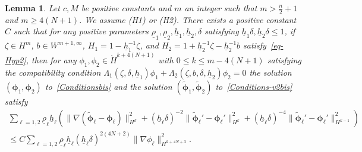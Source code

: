 \documentclass[11pt,leqno]{article}
\newtheorem{lemma}[theorem]{\bf Lemma}
\numberwithin{equation}{section}
\numberwithin{figure}{section}
\begin{document}
\begin{lemma}\label{L.estimate-phi-phi}
Let $c, M$ be positive constants and $m$ an integer such that $m>\frac{n}{2}+1$ and ${m\geq4(N+1)}$. 
We assume {\rm (H1)} or {\rm (H2)}. 
There exists a positive constant $C$ such that for any positive parameters 
$\underline{\rho}_1, \underline{\rho}_2, \underline{h}_1, \underline{h}_2, \delta$ 
satisfying $\underline{h}_1\delta, \underline{h}_2\delta \leq 1$, 
if $\zeta\in H^m$, $b\in W^{m+1,\infty}$, $H_1 = 1 - \underline{h}_1^{-1}\zeta$, 
and $H_2 = 1 + \underline{h}_2^{-1}\zeta - \underline{h}_2^{-1}b$ satisfy~\eqref{eq-Hyp2}, 
then for any $\phi_1,\phi_2 \in \mathring{H}^{k+4(N+1)}$ with $0\leq k\leq m-4(N+1)$ satisfying the compatibility condition 
$\Lambda_1(\zeta,\delta,\underline{h}_1)\phi_1+\Lambda_2(\zeta,b,\delta,\underline{h}_2)\phi_2=0$ 
the solution $(\bm{\phi}_1,\bm{\phi}_2)$ to~\eqref{Conditionsbis} and the solution 
$(\tilde{\bm{\phi}}_1,\tilde{\bm{\phi}}_2)$ to~\eqref{Conditions-v2bis} satisfy 
%
\begin{align*}
\sum_{\ell=1,2}\underline{\rho}_\ell \underline{h}_\ell(
 \|\nabla(\tilde{\bm{\phi}}_\ell-\bm{\phi}_\ell)\|_{H^k}^2
 + (\underline{h}_\ell\delta)^{-2}\|\tilde{\bm{\phi}}_\ell'-\bm{\phi}_\ell'\|_{H^k}^2
 + (\underline{h}_\ell\delta)^{-4}\|\tilde{\bm{\phi}}_\ell'-\bm{\phi}_\ell'\|_{H^{k-1}}^2 ) \\
\leq C\sum_{\ell=1,2}\underline{\rho}_\ell \underline{h}_\ell(\underline{h}_\ell\delta)^{2(4N+2)}\|\nabla\phi_\ell\|_{H^{k+4N+3}}^2.
\end{align*}
\end{lemma}
\end{document}
